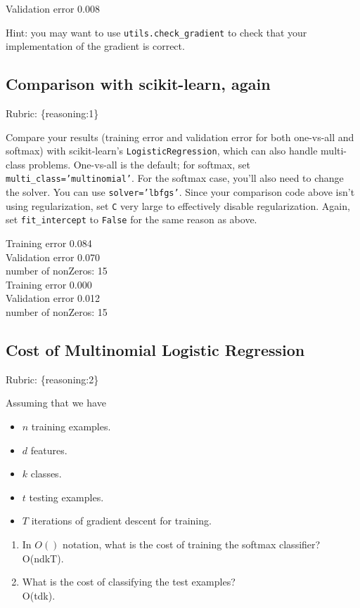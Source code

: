 \documentclass{article}
\def\rubric#1{\gre{Rubric: \{#1\}}}{}
\def\blu#1{{\color{blu}#1}}
\def\gre#1{{\color{gre}#1}}
\def\items#1{\begin{itemize}#1\end{itemize}}
\def\enum#1{\begin{enumerate}#1\end{enumerate}}
\begin{document}
 \blu{Validation error 0.008}

Hint: you may want to use \verb|utils.check_gradient| to check that your implementation of the gradient is correct.



\subsection{Comparison with scikit-learn, again}
\rubric{reasoning:1}

Compare your results (training error and validation error for both one-vs-all and softmax) with scikit-learn's \texttt{LogisticRegression}, 
which can also handle multi-class problems. 
One-vs-all is the default; for softmax, set \texttt{multi\string_class='multinomial'}. For the softmax case,
you'll also need to change the solver. You can use \texttt{solver='lbfgs'}.
Since your comparison code above isn't using regularization, set \texttt{C} very large to effectively disable regularization. 
Again, set \texttt{fit\string_intercept} to \texttt{False} for the same reason as above.

\blu{Training error 0.084\\
Validation error 0.070\\
number of nonZeros: 15\\
Training error 0.000\\
Validation error 0.012\\
number of  nonZeros: 15}

\subsection{Cost of Multinomial Logistic Regression}
\rubric{reasoning:2}

Assuming that we have
\items{
\item $n$ training examples.
\item $d$ features.
\item $k$ classes.
\item $t$ testing examples.
\item $T$ iterations of gradient descent for training.
}
\blu{\enum{
\item In $O()$ notation, what is the cost of training the softmax classifier?\\
 O(ndkT).
\item What is the cost of classifying the test examples?\\
 O(tdk).
}}
\end{document}
